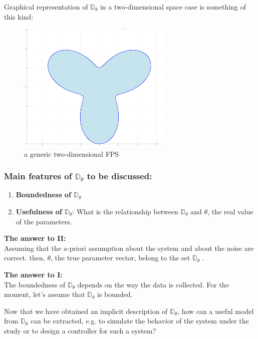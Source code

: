 Graphical representation of \(\mathbb{D}_\theta\) in a two-dimensional space case is something of this kind:

\begin{figure}[htbp]  %
    \centering
    \includegraphics[width=0.65\textwidth]{images/2d-fps.png}
    \caption{a generic two-dimensional FPS}
    \label{fig:2d-fps}
\end{figure}

\subsubsection{Main features of \(\mathbb{D}_\theta\) to be discussed:}


\begin{enumerate}[label=\Roman*.] %
    \item \textbf{Boundedness of \(\mathbb{D}_\theta\)}
    \item \textbf{Usefulness of \(\mathbb{D}_\theta\)}: What is the relationship between \(\mathbb{D}_\theta\) and \(\theta\), the real value of the parameters.
\end{enumerate}

\textbf{The answer to II: }\\
Assuming that the a-priori assumption about the system and about the noise are correct. then, \(\theta\), the true parameter vector, belong to the set \(\mathbb{D}_\theta\) .

\textbf{The answer to I: }\\
The boundedness of \(\mathbb{D}_\theta\) depends on the way the data is collected. For the moment, let's assume that \(\mathbb{D}_\theta\) is bounded. 

Now that we have obtained an implicit description of \(\mathbb{D}_\theta\), how can a useful model from \(\mathbb{D}_\theta\) can be extracted, e.g. to simulate the behavior of the system under the study or to design a controller for such a system?


